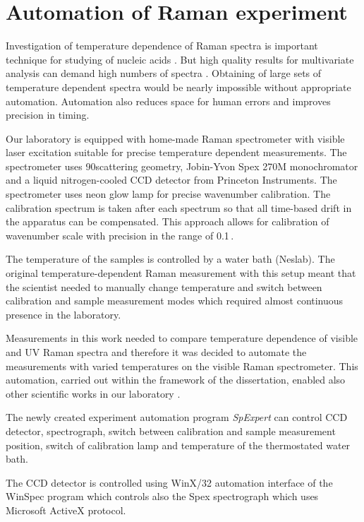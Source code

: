 \section{Automation of Raman experiment}

Investigation of temperature dependence of Raman spectra is important technique
for studying of nucleic acids
\parencite{Klener2021}.
But high quality results for multivariate analysis can demand high numbers of
spectra
\parencite{Palacky2020}.
Obtaining of large sets of temperature dependent spectra
would be nearly impossible without appropriate automation.
Automation also reduces space for human errors and improves precision in
timing.

Our laboratory is equipped with home-made Raman spectrometer with visible laser
excitation suitable for precise temperature dependent measurements.
The spectrometer uses 90\textdegree scattering geometry, Jobin-Yvon Spex 270M
monochromator and a liquid nitrogen-cooled CCD detector from Princeton
Instruments.
The spectrometer uses neon glow lamp for precise wavenumber calibration.
The calibration spectrum is taken after each spectrum so that all time-based
drift in the apparatus can be compensated.
This approach allows for calibration of wavenumber scale with precision in the
range of 0.1\,\icm{}.

The temperature of the samples is controlled by a water bath (Neslab).
The original
temperature-dependent Raman measurement with this setup meant that the
scientist needed to manually change temperature and switch between calibration
and sample measurement modes which required almost continuous presence
in the laboratory.

Measurements in this work needed to compare temperature dependence of visible
and UV Raman spectra
\parencite{Klener2021}
and therefore it was decided to automate the measurements with varied
temperatures on the visible Raman spectrometer.
This automation, carried out within the framework of the dissertation, enabled
also other scientific works in our laboratory
\parencite{%
	Mudronova2016,%
	Bravo2018,%
	Palacky2020%
}.

The newly created experiment automation program \emph{SpExpert} can control
CCD detector, spectrograph, switch between calibration and sample measurement
position, switch of calibration lamp and temperature of the thermostated
water bath.

The CCD detector is controlled using WinX/32 automation interface of the
WinSpec program which controls also the Spex spectrograph which uses Microsoft
ActiveX protocol.

